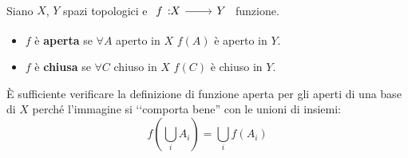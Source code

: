\begin{define}~{}\\
Siano $X$, $Y$ spazi topologici e $\funz{f}{X}{Y}$ funzione.
\begin{itemize}
\item $f$ è \textbf{aperta} se $\forall A$ aperto in $X$ $f\left(A\right)$ è aperto in $Y$.
\item $f$ è \textbf{chiusa} se $\forall C$ chiuso in $X$ $f\left(C\right)$ è chiuso in $Y$.
\end{itemize}
\vspace{-3mm}
\end{define}
\begin{observe}
	È sufficiente verificare la definizione di funzione aperta per gli aperti di una base di $X$ perché l'immagine si ‘‘comporta bene'' con le unioni di insiemi:
	\begin{equation*}
		f\left(\bigcup_{i}A_i\right)=\bigcup_{i}f\left(A_i\right)
	\end{equation*}
\end{observe}
